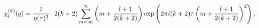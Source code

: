 \begin{equation}
 \chi^{(k)}_l(q) =
 {1 \over {\eta(\tau)^3}} \cdot 2(k+2)
 \sum_{m=\infty}^\infty \left( m + {{l+1} \over {2(k+2)}} \right)
 \exp \left(
       2 \pi i (k+2) \tau
         \left( m + {{l+1} \over {2(k+2)}} \right)^2
      \right),
\end{equation}

